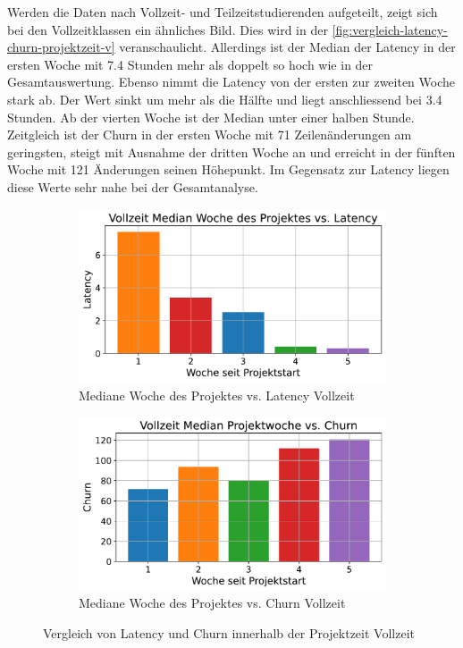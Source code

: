 Werden die Daten nach Vollzeit- und Teilzeitstudierenden aufgeteilt, zeigt sich bei den Vollzeitklassen ein ähnliches Bild. Dies wird in der \autoref{fig:vergleich-latency-churn-projektzeit-v} veranschaulicht. Allerdings ist der Median der Latency in der ersten Woche mit 7.4 Stunden mehr als doppelt so hoch wie in der Gesamtauswertung. Ebenso nimmt die Latency von der ersten zur zweiten Woche stark ab. Der Wert sinkt um mehr als die Hälfte und liegt anschliessend bei 3.4 Stunden. Ab der vierten Woche ist der Median unter einer halben Stunde. Zeitgleich ist der Churn in der ersten Woche mit 71 Zeilenänderungen am geringsten, steigt mit Ausnahme der dritten Woche an und erreicht in der fünften Woche mit 121 Änderungen seinen Höhepunkt. Im Gegensatz zur Latency liegen diese Werte sehr nahe bei der Gesamtanalyse.
\begin{figure}[htbp]
    \centering
    \begin{subfigure}[b]{0.48\textwidth}
        \centering
        \includegraphics[width=\textwidth]{Figures/mittelwert-woche-latency-v.pdf}
        \caption{Mediane Woche des Projektes vs. Latency Vollzeit}
        \label{fig:mittelwert-woche-lateny-v}
    \end{subfigure}
    \hfill
    \begin{subfigure}[b]{0.48\textwidth}
        \centering
        \includegraphics[width=\textwidth]{Figures/mittelwert-woche-churn-v.pdf}
        \caption{Mediane Woche des Projektes vs. Churn Vollzeit}
        \label{fig:mittelwert-woche-churn-v}
    \end{subfigure}
    \caption{Vergleich von Latency und Churn innerhalb der Projektzeit Vollzeit}
    \label{fig:vergleich-latency-churn-projektzeit-v}
\end{figure}

